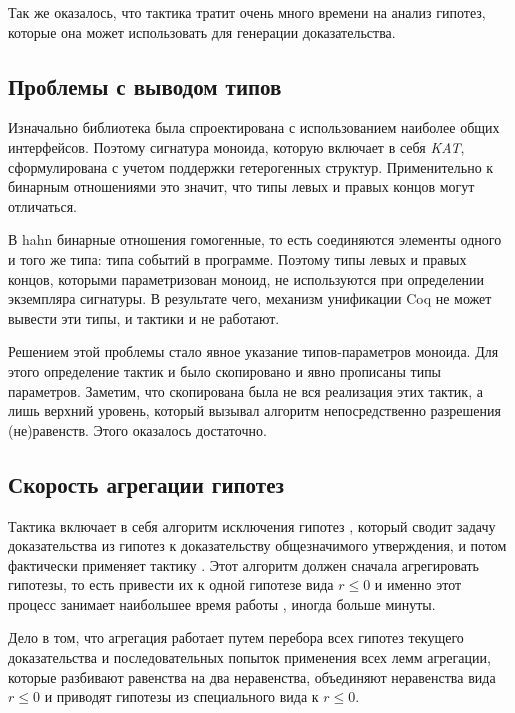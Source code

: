 \documentclass[times
              ,specification
              ,annotation
              ]{itmo-student-thesis}
\begin{document}
    Так же оказалось, что тактика  тратит очень много времени на анализ гипотез, которые она
    может использовать для генерации доказательства.
    \subsection{Проблемы с выводом типов}
      Изначально библиотека была спроектирована с использованием наиболее общих интерфейсов. Поэтому
      сигнатура моноида, которую включает в себя \textit{KAT}, сформулирована с учетом
      поддержки гетерогенных структур.
      Применительно к бинарным отношениями это значит, что типы левых и правых концов могут
      отличаться.

      В hahn бинарные отношения гомогенные, то есть соединяются элементы одного и того же
      типа: типа событий в программе. Поэтому типы левых и правых концов, которыми
      параметризован моноид, не
      используются при определении экземпляра сигнатуры. В результате чего, механизм унификации Coq не
      может вывести эти типы, и тактики  и  не работают.

      Решением этой проблемы стало явное указание типов-параметров моноида. Для этого определение
      тактик  и  было скопировано и явно прописаны типы параметров. Заметим, что
      скопирована была не вся реализация этих тактик, а лишь верхний уровень, который вызывал
      алгоритм непосредственно разрешения (не)равенств. Этого оказалось достаточно.

    \subsection{Скорость агрегации гипотез}

      Тактика  включает в себя алгоритм исключения гипотез \cite{hkat,hkat_cpc}, который
      сводит задачу доказательства из гипотез к доказательству общезначимого утверждения,
      и потом фактически применяет тактику . Этот алгоритм должен сначала агрегировать
      гипотезы, то есть привести их к одной гипотезе вида
      $r \leq 0$ и именно этот процесс занимает наибольшее время работы , иногда больше минуты.

      Дело в том, что агрегация работает путем перебора всех гипотез текущего доказательства и
      последовательных попыток
      применения всех лемм агрегации, которые разбивают равенства на два неравенства,
      объединяют неравенства вида $r \leq 0$ и приводят гипотезы из специального вида к $r \leq 0$.
\end{document}
